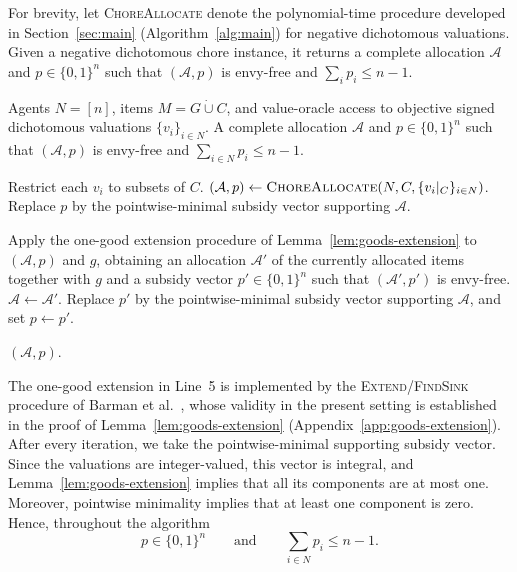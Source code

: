 \documentclass[11pt]{article}
\theoremstyle{plain}
\theoremstyle{plain}
\newcommand{\alloc}{\mathcal{A}}              %
\begin{document}
For brevity, let \textsc{ChoreAllocate} denote the polynomial-time procedure developed in Section~\ref{sec:main} (Algorithm~\ref{alg:main}) for negative dichotomous valuations. Given a negative dichotomous chore instance, it returns a complete allocation $\alloc$ and $p\in\{0,1\}^n$ such that $(\alloc,p)$ is envy-free and $\sum_i p_i\le n-1$.

\begin{algorithm}[H]
\caption{Unit subsidies for objective signed dichotomous valuations}
\label{alg:objective-mixed}
\begin{algorithmic}[1]
\Require Agents $N=[n]$, items $M=G\mathbin{\dot\cup}C$, and value-oracle access to objective signed dichotomous valuations $\{v_i\}_{i\in N}$.
\Ensure A complete allocation $\alloc$ and $p\in\{0,1\}^n$ such that $(\alloc,p)$ is envy-free and $\sum_{i\in N}p_i\le n-1$.

\State Restrict each $v_i$ to subsets of $C$.
\State $(\alloc,p)\gets\textsc{ChoreAllocate}(N,C,\{v_i|_C\}_{i\in N})$.
\State Replace $p$ by the pointwise-minimal subsidy vector supporting $\alloc$.

    \State Apply the one-good extension procedure of Lemma~\ref{lem:goods-extension} to $(\alloc,p)$ and $g$, obtaining an allocation $\alloc'$ of the currently allocated items together with $g$ and a subsidy vector $p'\in\{0,1\}^n$ such that $(\alloc',p')$ is envy-free.
    \State $\alloc\gets\alloc'$.
    \State Replace $p'$ by the pointwise-minimal subsidy vector supporting $\alloc$, and set $p\gets p'$.
\EndFor

\State \Return $(\alloc,p)$.
\end{algorithmic}
\end{algorithm}

The one-good extension in Line~5 is implemented by the \textsc{Extend}/\textsc{FindSink} procedure of Barman et al.~\cite{BKNS22}, whose validity in the present setting is established in the proof of Lemma~\ref{lem:goods-extension} (Appendix~\ref{app:goods-extension}). After every iteration, we take the pointwise-minimal supporting subsidy vector. Since the valuations are integer-valued, this vector is integral, and Lemma~\ref{lem:goods-extension} implies that all its components are at most one. Moreover, pointwise minimality implies that at least one component is zero. Hence, throughout the algorithm
\[
p\in\{0,1\}^n
\qquad\text{and}\qquad
\sum_{i\in N}p_i\le n-1.
\]

\end{document}
